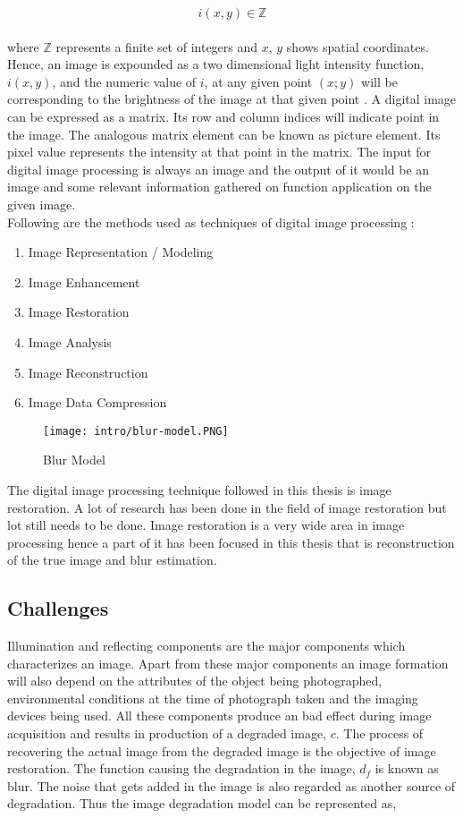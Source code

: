 \documentclass{article}
\begin{document}
\begin{equation}
    i(x, y) \in \mathbb{Z}
\end{equation} \\

where $\mathbb{Z}$ represents a finite set of integers and $x$, $y$ shows spatial coordinates. Hence, an image is expounded as a two dimensional light intensity function, $i(x, y)$, and the numeric value of $i$, at any given point $(x; y)$ will be corresponding to the brightness of the image at that given point \cite{jain-anil}. A digital image can be expressed as a matrix. Its row and column indices will indicate point in the image. The analogous matrix element can be known as picture element. Its pixel value represents the intensity at that point in the matrix. The input for digital image processing is always an image and the output of it would be an image and some relevant information gathered on function application on the given image. \\

Following are the methods used as techniques of digital image processing \cite{gonzalez-woods}:
\begin{enumerate}
    \item Image Representation / Modeling
    \item Image Enhancement
    \item Image Restoration
    \item Image Analysis
    \item Image Reconstruction
    \item Image Data Compression
\end{enumerate}

\begin{figure}[ht]
    \centering
    \texttt{[image: intro/blur-model.PNG]}
    \caption{Blur Model}
    \label{fig:blur-model}
\end{figure}

The digital image processing technique followed in this thesis is image restoration. A lot of research has been done in the field of image restoration but lot still needs to be done. Image restoration is a very wide area in image processing hence a part of it has been focused in this thesis that is reconstruction of the true image and blur estimation. 

\subsection{Challenges}
Illumination and reflecting components are the major components which characterizes an image. Apart from these major components an image formation will also depend on the attributes of the object being photographed, environmental conditions at the time of photograph taken and the imaging devices being used. All these components produce an bad effect during image acquisition \cite{22} and results in production of a degraded image, $c$. The process of recovering the actual image from the degraded image is the objective of image restoration. The function causing the degradation in the image, $d_f$ is known as blur. The noise that gets added in the image is also regarded as another source of degradation. Thus the image degradation model can be represented as, 
\end{document}
